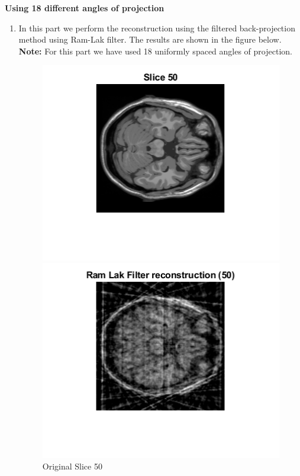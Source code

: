 \documentclass[12pt]{article}
\begin{document}
\textbf{Using 18 different angles of projection }
\begin{enumerate}[label = (\alph*)]
    \item In this part we perform the reconstruction using the filtered back-projection method using Ram-Lak filter. The results are shown in the figure below. \\
    \textbf{Note:} For this part we have used 18 uniformly spaced angles of projection.
    \begin{figure}[H]
        \centering
        \begin{minipage}{.45\textwidth}
            \centering
            \includegraphics[width=\linewidth]{Images/Q3_50.png}
            \caption*{Original Slice 50}
        \end{minipage}
        \begin{minipage}{.45\textwidth}
            \centering
            \includegraphics[width=\linewidth]{Images/Q3_50_a.png}

\end{minipage}
\end{figure}
\end{enumerate}
\end{document}
